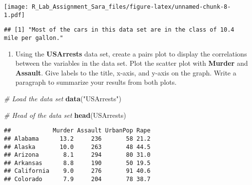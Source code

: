 \documentclass[
]{article}
\newenvironment{Shaded}{\begin{snugshade}}{\end{snugshade}}
\newcommand{\AttributeTok}[1]{\textcolor[rgb]{0.13,0.29,0.53}{#1}}
\newcommand{\CommentTok}[1]{\textcolor[rgb]{0.56,0.35,0.01}{\textit{#1}}}
\newcommand{\ConstantTok}[1]{\textcolor[rgb]{0.56,0.35,0.01}{#1}}
\newcommand{\DecValTok}[1]{\textcolor[rgb]{0.00,0.00,0.81}{#1}}
\newcommand{\FunctionTok}[1]{\textcolor[rgb]{0.13,0.29,0.53}{\textbf{#1}}}
\newcommand{\NormalTok}[1]{#1}
\newcommand{\OtherTok}[1]{\textcolor[rgb]{0.56,0.35,0.01}{#1}}
\newcommand{\SpecialCharTok}[1]{\textcolor[rgb]{0.81,0.36,0.00}{\textbf{#1}}}
\newcommand{\StringTok}[1]{\textcolor[rgb]{0.31,0.60,0.02}{#1}}
\providecommand{\tightlist}{%
  \setlength{\itemsep}{0pt}\setlength{\parskip}{0pt}}
\begin{document}
\texttt{[image: R\_Lab\_Assignment\_Sara\_files/figure-latex/unnamed-chunk-8-1.pdf]}

\begin{Shaded}
\end{Shaded}

\begin{verbatim}
## [1] "Most of the cars in this data set are in the class of 10.4 mile per gallon."
\end{verbatim}

\begin{enumerate}
\def\labelenumi{\alph{enumi}.}
\setcounter{enumi}{2}
\tightlist
\item
  Using the \textbf{USArrests} data set, create a pairs plot to display
  the correlations between the variables in the data set. Plot the
  scatter plot with \textbf{Murder} and \textbf{Assault}. Give labels to
  the title, x-axis, and y-axis on the graph. Write a paragraph to
  summarize your results from both plots.
\end{enumerate}

\begin{Shaded}
\begin{Highlighting}[]
\CommentTok{\# Load the data set}
\FunctionTok{data}\NormalTok{(}\StringTok{"USArrests"}\NormalTok{)}

\CommentTok{\# Head of the data set}
\FunctionTok{head}\NormalTok{(USArrests)}
\end{Highlighting}
\end{Shaded}

\begin{verbatim}
##            Murder Assault UrbanPop Rape
## Alabama      13.2     236       58 21.2
## Alaska       10.0     263       48 44.5
## Arizona       8.1     294       80 31.0
## Arkansas      8.8     190       50 19.5
## California    9.0     276       91 40.6
## Colorado      7.9     204       78 38.7
\end{verbatim}
\end{document}
